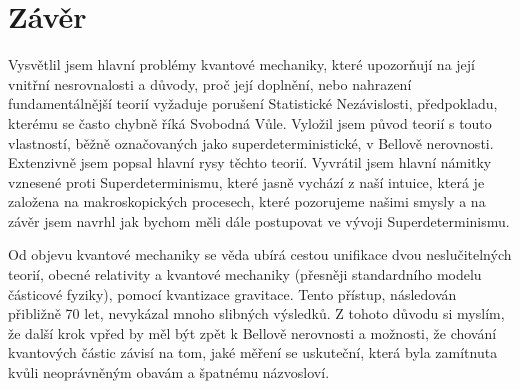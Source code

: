 \section{Závěr}

Vysvětlil jsem hlavní problémy kvantové mechaniky, které upozorňují na její vnitřní nesrovnalosti a důvody, proč její doplnění, nebo nahrazení fundamentálnější teorií vyžaduje porušení Statistické Nezávislosti, předpokladu, kterému se často chybně říká Svobodná Vůle. Vyložil jsem původ teorií s touto vlastností, běžně označovaných jako superdeterministické, v Bellově nerovnosti. Extenzivně jsem popsal hlavní rysy těchto teorií. Vyvrátil jsem hlavní námitky vznesené proti Superdeterminismu, které jasně vychází z naší intuice, která je založena na makroskopických procesech, které pozorujeme našimi smysly a na závěr jsem navrhl jak bychom měli dále postupovat ve vývoji Superdeterminismu.

Od objevu kvantové mechaniky se věda ubírá cestou unifikace dvou neslučitelných teorií, obecné relativity a kvantové mechaniky (přesněji standardního modelu částicové fyziky), pomocí kvantizace gravitace. Tento přístup, následován přibližně 70 let, nevykázal mnoho slibných výsledků. Z tohoto důvodu si myslím, že další krok vpřed by měl být zpět k Bellově nerovnosti a možnosti, že chování kvantových částic závisí na tom, jaké měření se uskuteční, která byla zamítnuta kvůli neoprávněným obavám a špatnému názvosloví.